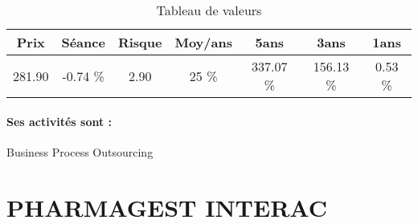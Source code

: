 \documentclass[11pt,a4paper]{report}%
\begin{document}
\begin{table}[H]
  \centering
    \begin{tabular}{|c|c|c|c|c|c|c|}
    \hline
    Prix & Séance & Risque  & Moy/ans & 5ans & 3ans & 1ans \\
    \hline
    281.90 &    -0.74 \%    & 2.90 & 25 \% & 337.07 \% & 156.13 \% & 0.53 \% \\
    \hline
    \end{tabular}%
        \label{tab:table_TELEPERFORMANCE}%
      \caption{Tableau de valeurs}
\end{table}%

\paragraph{Ses activités sont : } Business Process Outsourcing 
    
    \newpage

\section{PHARMAGEST INTERAC}
\end{document}
